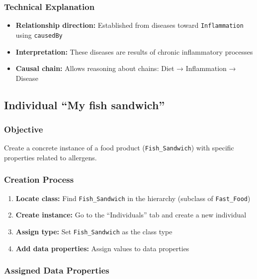 \documentclass[12pt,a4paper]{article}
\begin{document}
\subsubsection{Technical Explanation}

\begin{itemize}
    \item \textbf{Relationship direction:} Established from diseases toward \texttt{Inflammation} using \texttt{causedBy}
    \item \textbf{Interpretation:} These diseases are results of chronic inflammatory processes
    \item \textbf{Causal chain:} Allows reasoning about chains: Diet → Inflammation → Disease
\end{itemize}

\subsection{Individual ``My fish sandwich''}

\subsubsection{Objective}

Create a concrete instance of a food product (\texttt{Fish\_Sandwich}) with specific properties related to allergens.

\subsubsection{Creation Process}

\begin{enumerate}
    \item \textbf{Locate class:} Find \texttt{Fish\_Sandwich} in the hierarchy (subclass of \texttt{Fast\_Food})
    \item \textbf{Create instance:} Go to the ``Individuals'' tab and create a new individual
    \item \textbf{Assign type:} Set \texttt{Fish\_Sandwich} as the class type
    \item \textbf{Add data properties:} Assign values to data properties
\end{enumerate}

\subsubsection{Assigned Data Properties}
\end{document}
